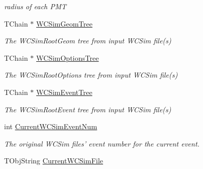 \begin{DoxyCompactItemize}
\begin{DoxyCompactList}\small\item\em radius of each P\-M\-T \end{DoxyCompactList}\item 
\hypertarget{classDataModel_aaff7bd723178271d795835e7d1e1dbef}{T\-Chain $\ast$ \hyperlink{classDataModel_aaff7bd723178271d795835e7d1e1dbef}{W\-C\-Sim\-Geom\-Tree}}\label{classDataModel_aaff7bd723178271d795835e7d1e1dbef}

\begin{DoxyCompactList}\small\item\em The {\ttfamily W\-C\-Sim\-Root\-Geom} tree from input W\-C\-Sim file(s) \end{DoxyCompactList}\item 
\hypertarget{classDataModel_a89cf7601bf57652b4a1363ec7dbc6dba}{T\-Chain $\ast$ \hyperlink{classDataModel_a89cf7601bf57652b4a1363ec7dbc6dba}{W\-C\-Sim\-Options\-Tree}}\label{classDataModel_a89cf7601bf57652b4a1363ec7dbc6dba}

\begin{DoxyCompactList}\small\item\em The {\ttfamily W\-C\-Sim\-Root\-Options} tree from input W\-C\-Sim file(s) \end{DoxyCompactList}\item 
\hypertarget{classDataModel_a5154cb6c2af332e5db8cf9c7620369f1}{T\-Chain $\ast$ \hyperlink{classDataModel_a5154cb6c2af332e5db8cf9c7620369f1}{W\-C\-Sim\-Event\-Tree}}\label{classDataModel_a5154cb6c2af332e5db8cf9c7620369f1}

\begin{DoxyCompactList}\small\item\em The {\ttfamily W\-C\-Sim\-Root\-Event} tree from input W\-C\-Sim file(s) \end{DoxyCompactList}\item 
\hypertarget{classDataModel_af13fe686acf2a60b84315c65f00af3cf}{int \hyperlink{classDataModel_af13fe686acf2a60b84315c65f00af3cf}{Current\-W\-C\-Sim\-Event\-Num}}\label{classDataModel_af13fe686acf2a60b84315c65f00af3cf}

\begin{DoxyCompactList}\small\item\em The original W\-C\-Sim files' event number for the current event. \end{DoxyCompactList}\item 
\hypertarget{classDataModel_ad368f473d985725a81a460595945c25b}{T\-Obj\-String \hyperlink{classDataModel_ad368f473d985725a81a460595945c25b}{Current\-W\-C\-Sim\-File}}\label{classDataModel_ad368f473d985725a81a460595945c25b}


\end{DoxyCompactItemize}
